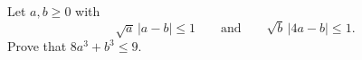 Let $a,b\ge0$ with
\[\sqrt a\,|a-b|\le1\qquad\text{and}\qquad\sqrt b\,|4a-b|\le1.\]
Prove that $8a^3+b^3\le9$.
